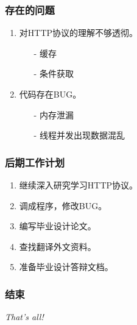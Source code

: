 \documentclass[12pt]{beamer}
\begin{document}
\begin{CJK}{UTF8}{gbsn}
\begin{frame}
	\frametitle{存在的问题}
	\begin{enumerate}
		\item 对HTTP协议的理解不够透彻。
		\begin{itemize}
			\item[-] 缓存
			\item[-] 条件获取
		\end{itemize}
		\pause
		\item 代码存在BUG。
		\begin{itemize}
			\item[-] 内存泄漏
			\item[-] 线程并发出现数据混乱
		\end{itemize}
	\end{enumerate}
\end{frame}

\begin{frame}
	\frametitle{后期工作计划}
	\begin{enumerate}
		\item 继续深入研究学习HTTP协议。
		\item 调成程序，修改BUG。
		\item 编写毕业设计论文。
		\item 查找翻译外文资料。
		\item 准备毕业设计答辩文档。
	\end{enumerate}
\end{frame}

\begin{frame}
	\frametitle{结束}
	\begin{center}
	{\Huge
		\textit{That's all!}
	}
	\end{center}
\end{frame}

\end{CJK}
\end{document}
